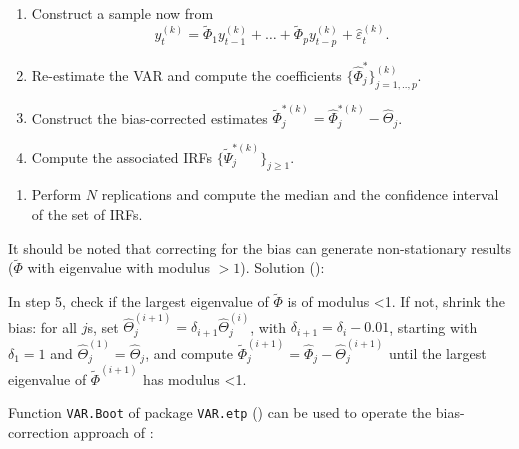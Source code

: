 \documentclass[
  12pt,
]{book}
\newenvironment{Shaded}{\begin{snugshade}}{\end{snugshade}}
\newcommand{\AttributeTok}[1]{\textcolor[rgb]{0.77,0.63,0.00}{#1}}
\newcommand{\CommentTok}[1]{\textcolor[rgb]{0.56,0.35,0.01}{\textit{#1}}}
\newcommand{\DecValTok}[1]{\textcolor[rgb]{0.00,0.00,0.81}{#1}}
\newcommand{\FunctionTok}[1]{\textcolor[rgb]{0.00,0.00,0.00}{#1}}
\newcommand{\NormalTok}[1]{#1}
\newcommand{\OtherTok}[1]{\textcolor[rgb]{0.56,0.35,0.01}{#1}}
\newcommand{\SpecialCharTok}[1]{\textcolor[rgb]{0.00,0.00,0.00}{#1}}
\newcommand{\StringTok}[1]{\textcolor[rgb]{0.31,0.60,0.02}{#1}}
\providecommand{\tightlist}{%
  \setlength{\itemsep}{0pt}\setlength{\parskip}{0pt}}
\theoremstyle{definition}
\theoremstyle{definition}
\theoremstyle{definition}
\theoremstyle{definition}
\theoremstyle{remark}
\begin{document}
\begin{enumerate}
\def\labelenumi{\alph{enumi}.}
\tightlist
\item
  Construct a sample now from
  \[y_t^{(k)}=\widetilde{\Phi}_1 y_{t-1}^{(k)} + \dots + \widetilde{\Phi}_p y_{t-p}^{(k)} + \hat\varepsilon_t^{(k)}.
  \]
\item
  Re-estimate the VAR and compute the coefficients \(\{\widehat{\Phi}^*_j\}_{j=1,..,p}^{(k)}\).
\item
  Construct the bias-corrected estimates \(\widetilde{\Phi}_j^{*(k)}=\widehat{\Phi}_j^{*(k)}-\widehat{\Theta}_j\).
\item
  Compute the associated IRFs \(\{\widetilde{\Psi}_j^{*(k)}\}_{j\ge 1}\).
\end{enumerate}

\begin{enumerate}
\def\labelenumi{\arabic{enumi}.}
\setcounter{enumi}{6}
\tightlist
\item
  Perform \(N\) replications and compute the median and the confidence interval of the set of IRFs.
\end{enumerate}

It should be noted that correcting for the bias can generate non-stationary results (\(\tilde \Phi\) with eigenvalue with modulus \(>1\)). Solution (\citet{Kilian_1998}):

In step 5, check if the largest eigenvalue of \(\tilde\Phi\) is of modulus \textless1.
If not, shrink the bias: for all \(j\)s, set \(\widehat{\Theta}_j^{(i+1)}=\delta_{i+1}\widehat{\Theta}_j^{(i)}\), with \(\delta_{i+1}=\delta_i-0.01\), starting with \(\delta_1=1\) and \(\widehat{\Theta}_j^{(1)} =\widehat{\Theta}_j\), and compute \(\widetilde{\Phi}_j^{(i+1)}=\widehat{\Phi}_j-\widehat{\Theta}_j^{(i+1)}\) until the largest eigenvalue of \(\tilde\Phi^{(i+1)}\) has modulus \textless1.

Function \texttt{VAR.Boot} of package \texttt{VAR.etp} (\citet{VARetp}) can be used to operate the bias-correction approach of \citet{Kilian_1998}:

\begin{Shaded}
\end{Shaded}
\end{document}
